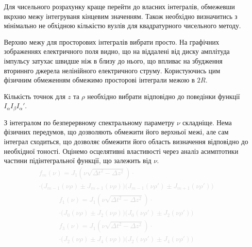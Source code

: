 Для чисельного розрахунку краще перейти до власних інтегралів, обмежевши
вкрхню межу інтегруваня кінцевим значенням. Також необхідно визначитись з 
мінімально не обхідною кількістю вузлів для квадратурного чисельного методу.

Верхню межу для просторових інтегралів вибрати просто. На графічних 
зображеннях електричного поля видно, що на віддалені від диску амплітуда
імпульсу затухає швидше ніж в близу до нього, що впливає на збудження 
вториннго джерела нелінійного електричного струму. Користуючись цим фізичним
обмеженням обмежимо просторові інтеграли межою в $ 2R $. 

Кількість точнок для $ z $ та $ \rho $ необхідно вибрати відповідно до поведінки 
функції $ I_\alpha I_\beta {I_\alpha}' $.

З інтегралом по безперервному спектральному параметру $ \nu $ складніще.
Нема фізичних передумов, що дозволяють обмежити його верхньої межі, але сам 
інтеграл сходиться, що дозволяє обмежити його область визначення відповідно 
до необхідної тоності. Оцінемо осцелятивні властивості через аналіз 
асимптотики частини підінтегральної функції, що залежить від $ \nu $.
%
\textcolor{lightgray} { \begin{equation*} \begin{aligned}
f_m (\nu) = J_1 \left( \nu \sqrt{\Delta t^2 - \Delta z^2} \right) \cdot \\ 
\cdot \Big( J_{m-1} (\nu \rho) \pm J_{m+1} (\nu \rho) \Big) 
\Big( J_{m-1} (\nu \rho') \pm J_{m+1} (\nu \rho') \Big)
\end{aligned} \end{equation*} }
%
\textcolor{lightgray} { \begin{equation*} \begin{aligned}
f_1 (\nu) = J_1 \left( \nu \sqrt{\Delta t^2 - \Delta z^2} \right) \cdot \\ 
\cdot \Big( J_{0} (\nu \rho) \pm J_{2} (\nu \rho) \Big) 
\Big( J_{0} (\nu \rho') \pm J_{2} (\nu \rho') \Big)
\end{aligned} \end{equation*} }
%
\textcolor{lightgray} { \begin{equation*} \begin{aligned}
f_3 (\nu) = J_1 \left( \nu \sqrt{\Delta t^2 - \Delta z^2} \right) \cdot \\ 
\cdot \Big( J_{2} (\nu \rho) \pm J_{4} (\nu \rho) \Big) 
\Big( J_{2} (\nu \rho') \pm J_{4} (\nu \rho') \Big)
\end{aligned} \end{equation*} }
